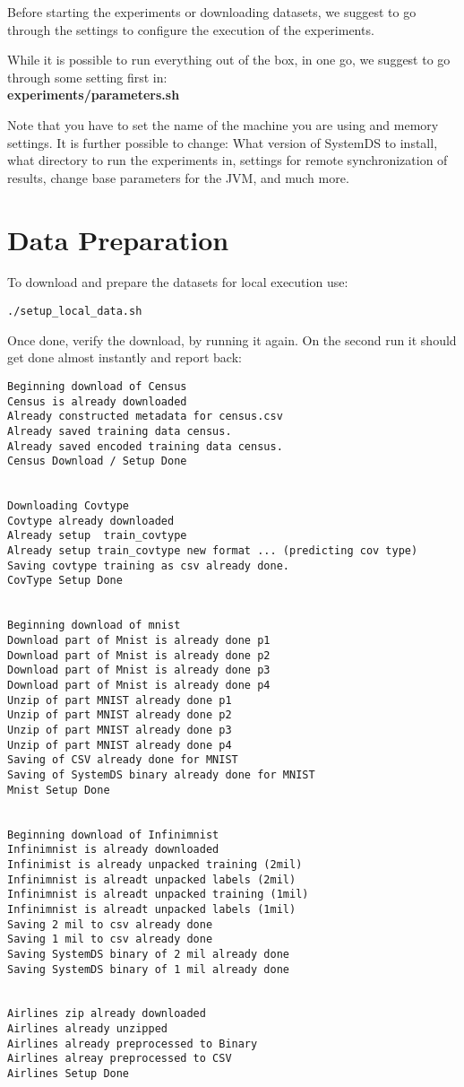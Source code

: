 \documentclass{readme}
\begin{document}
Before starting the experiments or downloading datasets,
we suggest to go through the settings to configure the execution of the experiments.

While it is possible to run everything out of the box, in one go,
we suggest to go through some setting first in: \\
\textbf{experiments/parameters.sh}

Note that you have to set the name of the machine you are using and memory settings.
It is further possible to change:
What version of SystemDS to install,
what directory to run the experiments in,
settings for remote synchronization of results,  
change base parameters for the JVM, 
and much more.


\section{Data Preparation}

To download and prepare the datasets for local execution use:


\begin{lstlisting}
./setup_local_data.sh
\end{lstlisting}

Once done, verify the download, by running it again.
On the second run it should get done almost instantly and report back:


\begin{lstlisting}
Beginning download of Census
Census is already downloaded
Already constructed metadata for census.csv
Already saved training data census.
Already saved encoded training data census.
Census Download / Setup Done


Downloading Covtype
Covtype already downloaded
Already setup  train_covtype
Already setup train_covtype new format ... (predicting cov type)
Saving covtype training as csv already done.
CovType Setup Done


Beginning download of mnist
Download part of Mnist is already done p1
Download part of Mnist is already done p2
Download part of Mnist is already done p3
Download part of Mnist is already done p4
Unzip of part MNIST already done p1
Unzip of part MNIST already done p2
Unzip of part MNIST already done p3
Unzip of part MNIST already done p4
Saving of CSV already done for MNIST
Saving of SystemDS binary already done for MNIST
Mnist Setup Done


Beginning download of Infinimnist
Infinimnist is already downloaded
Infinimist is already unpacked training (2mil)
Infinimnist is alreadt unpacked labels (2mil)
Infinimnist is alreadt unpacked training (1mil)
Infinimnist is alreadt unpacked labels (1mil)
Saving 2 mil to csv already done
Saving 1 mil to csv already done
Saving SystemDS binary of 2 mil already done
Saving SystemDS binary of 1 mil already done


Airlines zip already downloaded
Airlines already unzipped
Airlines already preprocessed to Binary
Airlines alreay preprocessed to CSV
Airlines Setup Done
\end{lstlisting}
\end{document}
